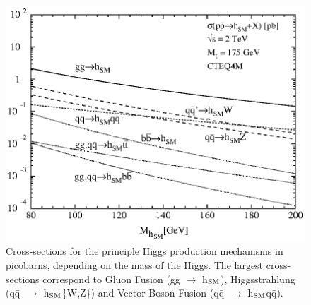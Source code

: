 \documentclass[12pt]{article}
\def\qqbar{q\={q}}
\begin{document}
\begin{figure}[p]
  \begin{center}
    \includegraphics[width=0.8\linewidth]{higgs_production.eps}
  \end{center}

  \caption{Cross-sections for the principle Higgs production
  mechanisms in picobarns, depending on the mass of the Higgs. The
  largest cross-sections correspond to Gluon Fusion (gg $\to$
  h$_{\mbox{\scriptsize SM}}$), Higgsstrahlung (\qqbar\ $\to$
  h$_{\mbox{\scriptsize SM}}$\{W,Z\}) and Vector Boson Fusion (\qqbar\
  $\to$ h$_{\mbox{\scriptsize SM}}$\qqbar).}

  \label{fig:production_xs}
\end{figure}
\end{document}
